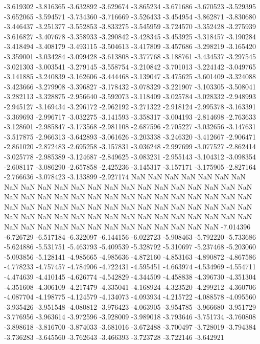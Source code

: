 -3.619302
-3.816365
-3.632892
-3.629674
-3.865234
-3.671686
-3.670523
-3.529395
-3.652065
-3.594571
-3.734360
-3.716669
-3.526433
-3.454954
-3.862871
-3.830680
-3.446437
-3.251377
-3.552853
-3.833275
-3.545959
-3.724570
-3.352428
-3.275939
-3.616827
-3.407678
-3.358933
-3.290842
-3.428345
-3.453925
-3.318457
-3.190284
-3.418494
-3.408179
-3.493115
-3.504613
-3.417809
-3.457686
-3.298219
-3.165420
-3.359001
-3.034284
-3.099428
-3.613808
-3.377768
-3.188761
-3.434537
-3.297545
-3.021303
-3.003541
-3.279145
-3.558754
-3.210842
-3.701013
-3.224142
-3.049765
-3.141885
-3.240839
-3.162606
-3.444468
-3.139047
-3.475625
-3.601409
-3.324088
-3.423666
-3.279908
-3.396827
-3.178432
-3.078329
-3.221907
-3.103305
-3.508041
-3.282113
-3.328875
-2.956640
-3.592073
-3.118409
-3.025784
-3.028332
-2.948993
-2.945127
-3.169434
-3.296172
-2.962192
-3.271322
-2.918124
-2.995378
-3.163391
-3.369693
-2.996717
-3.032275
-3.141593
-3.358317
-3.004193
-2.814698
-2.763633
-3.128601
-2.985847
-3.173568
-2.981108
-2.687596
-2.705227
-3.032656
-3.147631
-3.517875
-2.966313
-3.642893
-3.061626
-3.203338
-3.246320
-3.412667
-2.906471
-2.861020
-2.872483
-2.695258
-3.157831
-3.036248
-2.997699
-3.077527
-2.862414
-3.025778
-2.985389
-3.124687
-2.849625
-3.083231
-2.955143
-3.104312
-3.098354
-2.608117
-3.086290
-2.657858
-2.425236
-3.145317
-3.157171
-3.175905
-2.827164
-2.766636
-3.078423
-3.133899
-2.927174
NaN
NaN
NaN
NaN
NaN
NaN
NaN
NaN
NaN
NaN
NaN
NaN
NaN
NaN
NaN
NaN
NaN
NaN
NaN
NaN
NaN
NaN
NaN
NaN
NaN
NaN
NaN
NaN
NaN
NaN
NaN
NaN
NaN
NaN
NaN
NaN
NaN
NaN
NaN
NaN
NaN
NaN
NaN
NaN
NaN
NaN
NaN
NaN
NaN
NaN
NaN
NaN
NaN
NaN
NaN
NaN
NaN
NaN
NaN
NaN
NaN
NaN
NaN
NaN
NaN
NaN
NaN
NaN
NaN
NaN
NaN
NaN
NaN
NaN
NaN
NaN
NaN
NaN
NaN
NaN
-7.014396
-6.726729
-6.517184
-6.322097
-6.144156
-6.022723
-5.908463
-5.792220
-5.733686
-5.624886
-5.531751
-5.463793
-5.409539
-5.328792
-5.310697
-5.237468
-5.203060
-5.093856
-5.128141
-4.985665
-4.985636
-4.872160
-4.853163
-4.890872
-4.867586
-4.778233
-4.757457
-4.784906
-4.722431
-4.595451
-4.663974
-4.534969
-4.554711
-4.474639
-4.410145
-4.626774
-4.542829
-4.344509
-4.458838
-4.396730
-4.351304
-4.351608
-4.306109
-4.217479
-4.335041
-4.168924
-4.323520
-4.299212
-4.360706
-4.087704
-4.198775
-4.124579
-4.134073
-4.093934
-4.215722
-4.088578
-4.095560
-3.935426
-3.951548
-4.080812
-3.976423
-4.063905
-3.954785
-3.966680
-3.951729
-3.776956
-3.963614
-3.972596
-3.928009
-3.989018
-3.793646
-3.751734
-3.760808
-3.898618
-3.816700
-3.874033
-3.681016
-3.672488
-3.700497
-3.728019
-3.794384
-3.736283
-3.645560
-3.762643
-3.466393
-3.723728
-3.722146
-3.642921
